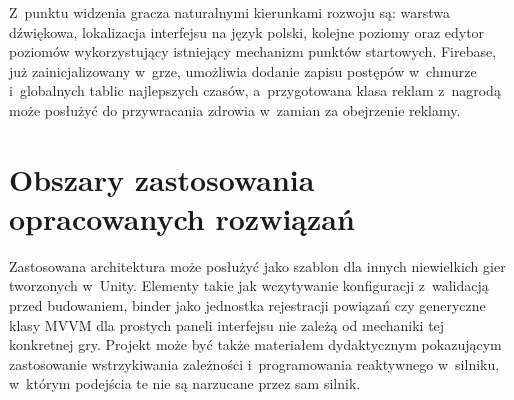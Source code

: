 Z~punktu widzenia gracza naturalnymi kierunkami rozwoju są: warstwa dźwiękowa, lokalizacja
interfejsu na język polski, kolejne poziomy oraz edytor poziomów wykorzystujący istniejący
mechanizm punktów startowych. Firebase, już zainicjalizowany w~grze, umożliwia dodanie
zapisu postępów w~chmurze i~globalnych tablic najlepszych czasów, a~przygotowana klasa
reklam z~nagrodą może posłużyć do przywracania zdrowia w~zamian za obejrzenie reklamy.

\section{Obszary zastosowania opracowanych rozwiązań}

Zastosowana architektura może posłużyć jako szablon dla innych niewielkich gier
tworzonych w~Unity. Elementy takie jak wczytywanie konfiguracji z~walidacją przed
budowaniem, binder jako jednostka rejestracji powiązań czy generyczne klasy MVVM dla prostych
paneli interfejsu nie zależą od mechaniki tej konkretnej gry. Projekt może być także materiałem dydaktycznym pokazującym
zastosowanie wstrzykiwania zależności i~programowania reaktywnego w~silniku, w~którym
podejścia te nie są narzucane przez sam silnik.
